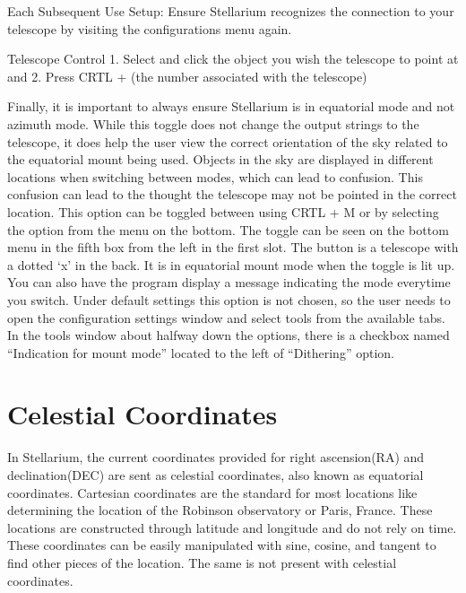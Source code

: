 \documentclass[12pt]{report}
\begin{document}
Each Subsequent Use Setup: Ensure Stellarium recognizes the connection to your telescope by visiting the configurations menu again.

Telescope Control
	1. Select and click the object you wish the telescope to point at and
	2. Press CRTL + (the number associated with the telescope)

Finally, it is important to always ensure Stellarium is in equatorial mode and not azimuth mode. While this toggle does not change the output strings to the telescope, it does help the user view the correct orientation of the sky related to the equatorial mount being used. Objects in the sky are displayed in different locations when switching between modes, which can lead to confusion. This confusion can lead to the thought the telescope may not be pointed in the correct location. This option can be toggled between using CRTL + M or by selecting the option from the menu on the bottom. The toggle can be seen on the bottom menu in the fifth box from the left in the first slot. The button is a telescope with a dotted ‘x’ in the back. It is in equatorial mount mode when the toggle is lit up. You can also have the program display a message indicating the mode everytime you switch. Under default settings this option is not chosen, so the user needs to open the configuration settings window and select tools from the available tabs. In the tools window about halfway down the options, there is a checkbox named “Indication for mount mode” located to the left of “Dithering” option.

\section*{Celestial Coordinates}

In Stellarium, the current coordinates provided for right ascension(RA) and declination(DEC) are sent as celestial coordinates, also known as equatorial coordinates. Cartesian coordinates are the standard for most locations like determining the location of the Robinson observatory or Paris, France. These locations are constructed through latitude and longitude and do not rely on time. These coordinates can be easily manipulated with sine, cosine, and tangent to find other pieces of the location. The same is not present with celestial coordinates.
\end{document}
